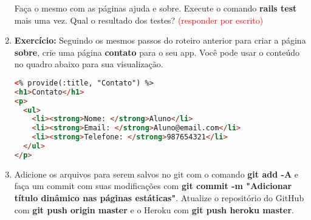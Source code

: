 \documentclass[a4paper,12pt]{article}
\begin{document}
\begin{enumerate}
  Faça o mesmo com as páginas ajuda e sobre. Execute o comando \textbf{rails test} mais uma vez. Qual o resultado dos testes? \textcolor{red}{(responder por escrito)}

  \item \textbf{Exercício:} Seguindo os mesmos passos do roteiro anterior para criar a página \textbf{sobre}, crie uma página \textbf{contato} para o seu app. Você pode usar o conteúdo no quadro abaixo para sua visualização.

    \begin{lstlisting}[language=html, title=app/views/paginas\_estaticas/contato.html.erb, basicstyle=\scriptsize]
<% provide(:title, "Contato") %>
<h1>Contato</h1>
<p>
  <ul>
    <li><strong>Nome: </strong>Aluno</li>
    <li><strong>Email: </strong>Aluno@email.com</li>
    <li><strong>Telefone: </strong>987654321</li>
  </ul>
</p>
  \end{lstlisting}

  \item Adicione os arquivos para serem salvos no git com o comando \textbf{git add -A} e faça um commit com suas modificações com \textbf{git commit -m "Adicionar título dinâmico nas páginas estáticas"}. Atualize o repositório do GitHub com \textbf{git push origin master} e o Heroku com \textbf{git push heroku master}.

\end{enumerate}
\end{document}
